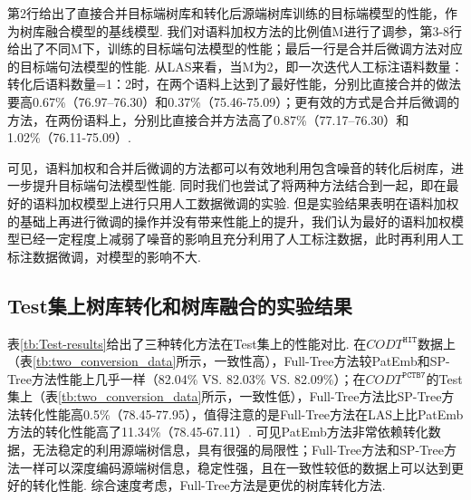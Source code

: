 第2行给出了直接合并目标端树库和转化后源端树库训练的目标端模型的性能，作为树库融合模型的基线模型. 我们对语料加权方法的比例值M进行了调参，第3-8行给出了不同M下，训练的目标端句法模型的性能；最后一行是合并后微调方法对应的目标端句法模型的性能. 从LAS来看，当M为2，即一次迭代人工标注语料数量：转化后语料数量=1：2时，在两个语料上达到了最好性能，分别比直接合并的做法要高0.67\%（76.97–76.30）和0.37\%（75.46-75.09）；更有效的方式是合并后微调的方法，在两份语料上，分别比直接合并方法高了0.87\%（77.17–76.30）和1.02\%（76.11-75.09）.

可见，语料加权和合并后微调的方法都可以有效地利用包含噪音的转化后树库，进一步提升目标端句法模型性能. 同时我们也尝试了将两种方法结合到一起，即在最好的语料加权模型上进行只用人工数据微调的实验. 但是实验结果表明在语料加权的基础上再进行微调的操作并没有带来性能上的提升，我们认为最好的语料加权模型已经一定程度上减弱了噪音的影响且充分利用了人工标注数据，此时再利用人工标注数据微调，对模型的影响不大.

\subsection{Test集上树库转化和树库融合的实验结果}
表\ref{tb:Test-results}给出了三种转化方法在Test集上的性能对比. 在$CODT^{\texttt{HIT}}$数据上（表\ref{tb:two_conversion_data}所示，一致性高），Full-Tree方法较PatEmb和SP-Tree方法性能上几乎一样（82.04\% VS. 82.03\% VS. 82.09\%）；在$CODT^{\texttt{PCTB7}}$的Test集上（表\ref{tb:two_conversion_data}所示，一致性低），Full-Tree方法比SP-Tree方法转化性能高0.5\%（78.45-77.95），值得注意的是Full-Tree方法在LAS上比PatEmb方法的转化性能高了11.34\%（78.45-67.11）. 可见PatEmb方法非常依赖转化数据，无法稳定的利用源端树信息，具有很强的局限性；Full-Tree方法和SP-Tree方法一样可以深度编码源端树信息，稳定性强，且在一致性较低的数据上可以达到更好的转化性能. 综合速度考虑，Full-Tree方法是更优的树库转化方法.

